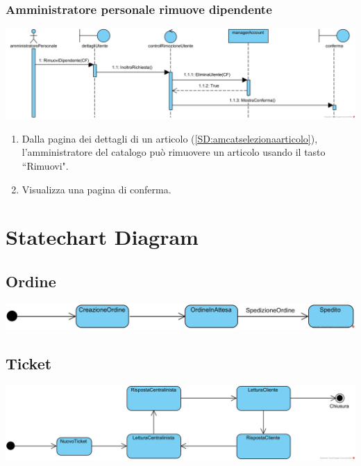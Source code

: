 \documentclass[12pt]{article}
\begin{document}
\subsubsection{Amministratore personale rimuove dipendente}
\label{SD:amperrimuove}
\begin{center}
\includegraphics[width=\textwidth]{SequenceDiagram/AmministratorePersonaleDipendenteRimuove}
\end{center}


\begin{enumerate}
\item Dalla pagina dei dettagli di un articolo (\ref{SD:amcatselezionaarticolo}), l'amministratore del catalogo può rimuovere un articolo usando il tasto ``Rimuovi".
\item Visualizza una pagina di conferma.
\end{enumerate}

\newpage

\section{Statechart Diagram}

\subsection{Ordine}
\includegraphics[width=\textwidth]{StateChart/Ordine}

\subsection{Ticket}
\includegraphics[width=\textwidth]{StateChart/Ticket}
\end{document}
